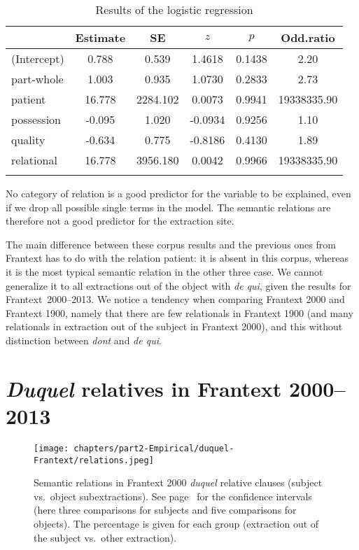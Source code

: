 \begin{table}
\begin{tabular}{l S[table-format=-2.3] S[table-format=4.3] S[table-format=-1.4] S[table-format=1.4] S[table-format=8.2]}
  \lsptoprule
         & {Estimate} & {SE} & {$z$} & {$p$} & {Odd.ratio} \\ 
  \midrule
(Intercept) & 0.788 & 0.539 & 1.4618 & 0.1438 & 2.20 \\ 
   part-whole & 1.003 & 0.935 & 1.0730 & 0.2833 & 2.73 \\ 
   patient & 16.778 & 2284.102 & 0.0073 & 0.9941 & 19338335.90 \\ 
   possession & -0.095 & 1.020 & -0.0934 & 0.9256 & 1.10 \\ 
   quality & -0.634 & 0.775 & -0.8186 & 0.4130 & 1.89 \\ 
   relational & 16.778 & 3956.180 & 0.0042 & 0.9966 & 19338335.90 \\ 
   \lspbottomrule
\end{tabular}
\caption{Results of the logistic regression}
        \label{tab:dq1900-relations}
\end{table}

No category of relation is a good predictor for the variable to be explained, even if we drop all possible single terms in the model. The semantic relations are therefore not a good predictor for the extraction site. 

The main difference between these corpus results and the previous ones from Frantext has to do with the relation patient: it is absent in this corpus, whereas it is the most typical semantic relation in the other three case. We cannot generalize it to all extractions out of the object with \emph{de qui}, given the results for Frantext~2000--2013. We notice a tendency when comparing Frantext 2000 and Frantext 1900, namely that there are few relationals in Frantext 1900 (and many relationals in extraction out of the subject in Frantext 2000), and this without distinction between \emph{dont} and \emph{de qui}. 

\section{\emph{Duquel} relatives in Frantext 2000--2013}


\begin{figure}
        \centering
        \texttt{[image: chapters/part2-Empirical/duquel-Frantext/relations.jpeg]}
        \caption[Semantics relations in Frantext 2000 \emph{duquel} relative clauses (subject vs.\ object subextractions)]{Semantic relations in Frantext 2000 \emph{duquel} relative clauses (subject vs.\ object subextractions). See page~\pageref{ch:conf-intervals-binomial} for the confidence intervals (here three comparisons for subjects and five comparisons for objects). The percentage is given for each group (extraction out of the subject vs.\ other extraction).}
        \label{fig:duquel-relations}
\end{figure}

